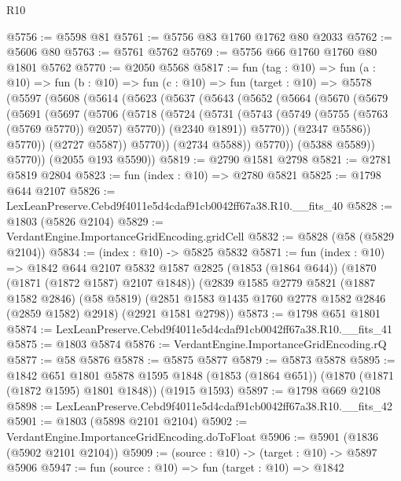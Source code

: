 \begin{lexlean}{R10}
\begin{coremodule}
@5756 := @5598 @81
@5761 := @5756 @83 @1760 @1762 @80 @2033
@5762 := @5606 @80
@5763 := @5761 @5762
@5769 := @5756 @66 @1760 @1760 @80 @1801 @5762
@5770 := @2050 @5568
@5817 := fun (tag : @10) =>
  fun (a : @10) =>
  fun (b : @10) =>
  fun (c : @10) =>
  fun (target : @10) =>
  @5578
    (@5597
      (@5608
        (@5614
          (@5623
            (@5637
              (@5643
                (@5652
                  (@5664
                    (@5670
                      (@5679
                        (@5691
                          (@5697
                            (@5706
                              (@5718
                                (@5724
                                  (@5731
                                    (@5743 (@5749 (@5755 (@5763 (@5769 @5770)) @2057) @5770))
                                    (@2340 @1891))
                                  @5770))
                              (@2347 @5586))
                            @5770))
                        (@2727 @5587))
                      @5770))
                  (@2734 @5588))
                @5770))
            (@5388 @5589))
          @5770))
      (@2055 @193 @5590))
@5819 := @2790 @1581 @2798
@5821 := @2781 @5819 @2804
@5823 := fun (index : @10) => @2780 @5821
@5825 := @1798 @644 @2107
@5826 := LexLeanPreserve.Cebd9f4011e5d4cdaf91cb0042ff67a38.R10.__fits_40
@5828 := @1803 (@5826 @2104)
@5829 := VerdantEngine.ImportanceGridEncoding.gridCell
@5832 := @5828 (@58 (@5829 @2104))
@5834 := (index : @10) -> @5825 @5832
@5871 := fun (index : @10) =>
  @1842
    @644
    @2107
    @5832
    @1587
    @2825
    (@1853 (@1864 @644))
    (@1870 (@1871 (@1872 @1587) @2107 @1848))
    (@2839
      @1585
      @2779
      @5821
      (@1887 @1582 @2846)
      (@58 @5819)
      (@2851 @1583 @1435 @1760 @2778 @1582 @2846 (@2859 @1582) @2918)
      (@2921 @1581 @2798))
@5873 := @1798 @651 @1801
@5874 := LexLeanPreserve.Cebd9f4011e5d4cdaf91cb0042ff67a38.R10.__fits_41
@5875 := @1803 @5874
@5876 := VerdantEngine.ImportanceGridEncoding.rQ
@5877 := @58 @5876
@5878 := @5875 @5877
@5879 := @5873 @5878
@5895 := @1842
    @651
    @1801
    @5878
    @1595
    @1848
    (@1853 (@1864 @651))
    (@1870 (@1871 (@1872 @1595) @1801 @1848))
    (@1915 @1593)
@5897 := @1798 @669 @2108
@5898 := LexLeanPreserve.Cebd9f4011e5d4cdaf91cb0042ff67a38.R10.__fits_42
@5901 := @1803 (@5898 @2101 @2104)
@5902 := VerdantEngine.ImportanceGridEncoding.doToFloat
@5906 := @5901 (@1836 (@5902 @2101 @2104))
@5909 := (source : @10) -> (target : @10) -> @5897 @5906
@5947 := fun (source : @10) =>
  fun (target : @10) =>
  @1842

\end{coremodule}
\end{lexlean}
